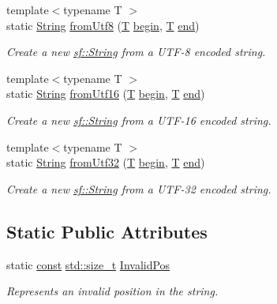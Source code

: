 \begin{DoxyCompactItemize}
{\footnotesize template$<$typename T $>$ }\\static \hyperlink{classsf_1_1_string}{String} \hyperlink{classsf_1_1_string_aa7beb7ae5b26e63dcbbfa390e27a9e4b}{from\-Utf8} (\hyperlink{curses_8priv_8h_a5ef253115820acf7d27f3c5c3b02a0f0}{T} \hyperlink{classsf_1_1_string_a8ec30ddc08e3a6bd11c99aed782f6dfe}{begin}, \hyperlink{curses_8priv_8h_a5ef253115820acf7d27f3c5c3b02a0f0}{T} \hyperlink{classsf_1_1_string_ac823012f39cb6f61100418876e99d53b}{end})
\begin{DoxyCompactList}\small\item\em Create a new \hyperlink{classsf_1_1_string}{sf\-::\-String} from a U\-T\-F-\/8 encoded string. \end{DoxyCompactList}\item 
{\footnotesize template$<$typename T $>$ }\\static \hyperlink{classsf_1_1_string}{String} \hyperlink{classsf_1_1_string_a81f70eecad0000a4f2e4d66f97b80300}{from\-Utf16} (\hyperlink{curses_8priv_8h_a5ef253115820acf7d27f3c5c3b02a0f0}{T} \hyperlink{classsf_1_1_string_a8ec30ddc08e3a6bd11c99aed782f6dfe}{begin}, \hyperlink{curses_8priv_8h_a5ef253115820acf7d27f3c5c3b02a0f0}{T} \hyperlink{classsf_1_1_string_ac823012f39cb6f61100418876e99d53b}{end})
\begin{DoxyCompactList}\small\item\em Create a new \hyperlink{classsf_1_1_string}{sf\-::\-String} from a U\-T\-F-\/16 encoded string. \end{DoxyCompactList}\item 
{\footnotesize template$<$typename T $>$ }\\static \hyperlink{classsf_1_1_string}{String} \hyperlink{classsf_1_1_string_ab023a4900dce37ee71ab9e29b30a23cb}{from\-Utf32} (\hyperlink{curses_8priv_8h_a5ef253115820acf7d27f3c5c3b02a0f0}{T} \hyperlink{classsf_1_1_string_a8ec30ddc08e3a6bd11c99aed782f6dfe}{begin}, \hyperlink{curses_8priv_8h_a5ef253115820acf7d27f3c5c3b02a0f0}{T} \hyperlink{classsf_1_1_string_ac823012f39cb6f61100418876e99d53b}{end})
\begin{DoxyCompactList}\small\item\em Create a new \hyperlink{classsf_1_1_string}{sf\-::\-String} from a U\-T\-F-\/32 encoded string. \end{DoxyCompactList}\end{DoxyCompactItemize}
\subsection*{Static Public Attributes}
\begin{DoxyCompactItemize}
\item 
static \hyperlink{term__entry_8h_a57bd63ce7f9a353488880e3de6692d5a}{const} \hyperlink{nc__alloc_8h_a7b60c5629e55e8ec87a4547dd4abced4}{std\-::size\-\_\-t} \hyperlink{classsf_1_1_string_a7dd58138a3f2bd887e5711879fd83570}{Invalid\-Pos}
\begin{DoxyCompactList}\small\item\em Represents an invalid position in the string. \end{DoxyCompactList}\end{DoxyCompactItemize}
